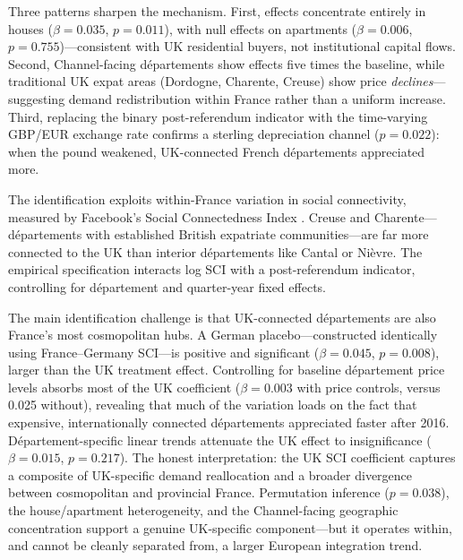 \documentclass[12pt]{article}
\begin{document}
Three patterns sharpen the mechanism. First, effects concentrate entirely in houses ($\beta = 0.035$, $p = 0.011$), with null effects on apartments ($\beta = 0.006$, $p = 0.755$)---consistent with UK residential buyers, not institutional capital flows. Second, Channel-facing d\'epartements show effects five times the baseline, while traditional UK expat areas (Dordogne, Charente, Creuse) show price \textit{declines}---suggesting demand redistribution within France rather than a uniform increase. Third, replacing the binary post-referendum indicator with the time-varying GBP/EUR exchange rate confirms a sterling depreciation channel ($p = 0.022$): when the pound weakened, UK-connected French d\'epartements appreciated more.

The identification exploits within-France variation in social connectivity, measured by Facebook's Social Connectedness Index \citep{bailey2018social, bailey2021international}. Creuse and Charente---d\'epartements with established British expatriate communities---are far more connected to the UK than interior d\'epartements like Cantal or Ni\`evre. The empirical specification interacts log SCI with a post-referendum indicator, controlling for d\'epartement and quarter-year fixed effects.

The main identification challenge is that UK-connected d\'epartements are also France's most cosmopolitan hubs. A German placebo---constructed identically using France--Germany SCI---is positive and significant ($\beta = 0.045$, $p = 0.008$), larger than the UK treatment effect. Controlling for baseline d\'epartement price levels absorbs most of the UK coefficient ($\beta = 0.003$ with price controls, versus 0.025 without), revealing that much of the variation loads on the fact that expensive, internationally connected d\'epartements appreciated faster after 2016. D\'epartement-specific linear trends attenuate the UK effect to insignificance ($\beta = 0.015$, $p = 0.217$). The honest interpretation: the UK SCI coefficient captures a composite of UK-specific demand reallocation and a broader divergence between cosmopolitan and provincial France. Permutation inference ($p = 0.038$), the house/apartment heterogeneity, and the Channel-facing geographic concentration support a genuine UK-specific component---but it operates within, and cannot be cleanly separated from, a larger European integration trend.
\end{document}

